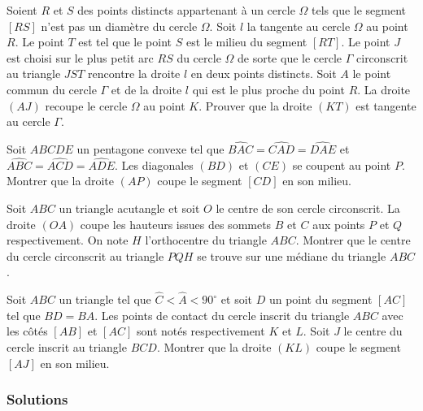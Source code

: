 \begin{exo}[IMO 2017 P4]
Soient $R$ et $S$ des points distincts appartenant à un cercle $\Omega$ tels que le segment $[RS]$ n'est pas un diamètre du cercle $\Omega$. Soit $l$ la tangente au cercle $\Omega$ au point $R$. Le point $T$ est tel que le point $S$ est le milieu du segment $[RT]$. Le point $J$ est choisi sur le plus petit arc $RS$ du cercle $\Omega$ de sorte que le cercle $\Gamma$ circonscrit au triangle $JST$ rencontre la droite $l$ en deux points distincts. Soit $A$ le point commun du cercle $\Gamma$ et de la droite $l$ qui est le plus proche du point $R$. La droite $(AJ)$ recoupe le cercle $\Omega$ au point $K$. Prouver que la droite $(KT)$ est tangente au cercle $\Gamma$.
\end{exo}


\begin{exo}[IMO SL 2006 G3]
Soit $ABCDE$ un pentagone convexe tel que
$\widehat{BAC}=\widehat{CAD}=\widehat{DAE}$ et $\widehat{ABC}=\widehat{ACD}=\widehat{ADE}$.
Les diagonales $(BD)$ et $(CE)$ se coupent au point $P$. Montrer que la droite $(AP)$ coupe le segment $[CD]$ en son milieu.
\end{exo}


\begin{exo}[IMO SL 2017 G3]
Soit $ABC$ un triangle acutangle et soit $O$ le centre de son cercle circonscrit. La droite $(OA)$ coupe les hauteurs issues des sommets $B$ et $C$ aux points $P$ et $Q$ respectivement. On note $H$ l'orthocentre du triangle $ABC$. Montrer que le centre du cercle circonscrit au triangle $PQH$ se trouve sur une médiane du triangle $ABC$.
\end{exo}


\begin{exo}[IMO SL 2006 G4]
Soit $ABC$ un triangle tel que $\widehat{C}<\widehat{A}<90^\circ$ et soit $D$ un point du segment $[AC]$ tel que $BD=BA$. Les points de contact du cercle inscrit du triangle $ABC$ avec les côtés $[AB]$ et $[AC]$ sont notés respectivement $K$ et $L$. Soit $J$ le centre du cercle inscrit au triangle $BCD$. Montrer que la droite $(KL)$ coupe le segment $[AJ]$ en son milieu.
\end{exo}


\subsubsection{Solutions}


